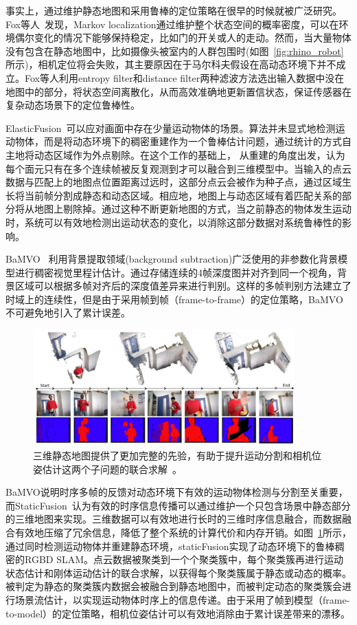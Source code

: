事实上，通过维护静态地图和采用鲁棒的定位策略在很早的时候就被广泛研究。Fox等人~\cite{fox1999}发现，Markov localization通过维护整个状态空间的概率密度，可以在环境偶尔变化的情况下能够保持稳定，比如门的开关或人的走动。然而，当大量物体没有包含在静态地图中，比如摄像头被室内的人群包围时(如图~\ref{fig:rhino_robot}所示)，相机定位将会失败，其主要原因在于马尔科夫假设在高动态环境下并不成立。Fox等人利用entropy filter和distance filter两种滤波方法选出输入数据中没在地图中的部分，将状态空间离散化，从而高效准确地更新置信状态，保证传感器在复杂动态场景下的定位鲁棒性。

ElasticFusion~\cite{elasticFusion}可以应对画面中存在少量运动物体的场景。算法并未显式地检测运动物体，而是将动态环境下的稠密重建作为一个鲁棒估计问题，通过统计的方式自主地将动态区域作为外点剔除。在这个工作的基础上，\cite{keller13_3dv} 从重建的角度出发，认为每个面元只有在多个连续帧被反复观测到才可以融合到三维模型中。当输入的点云数据与匹配上的地图点位置距离过远时，这部分点云会被作为种子点，通过区域生长将当前帧分割成静态和动态区域。相应地，地图上与动态区域有着匹配关系的部分将从地图上剔除掉。通过这种不断更新地图的方式，当之前静态的物体发生运动时，系统可以有效地检测出运动状态的变化，以消除这部分数据对系统鲁棒性的影响。

BaMVO~\cite{BaMVO} 利用背景提取领域(background subtraction)广泛使用的非参数化背景模型进行稠密视觉里程计估计。通过存储连续的4帧深度图并对齐到同一个视角，背景区域可以根据多帧对齐后的深度值差异来进行判别。这样的多帧判别方法建立了时域上的连续性，但是由于采用帧到帧（frame-to-frame）的定位策略，BaMVO不可避免地引入了累计误差。

\begin{figure}[!htbp]
	\centering
	\includegraphics[width=0.9\textwidth]{figs/2-1/staticFusion.jpeg}
	\caption{三维静态地图提供了更加完整的先验，有助于提升运动分割和相机位姿估计这两个子问题的联合求解~\cite{staticFusion}。}
	\label{fig:staticFusion}
\end{figure}

BaMVO说明时序多帧的反馈对动态环境下有效的运动物体检测与分割至关重要，而StaticFusion~\cite{staticFusion}认为有效的时序信息传播可以通过维护一个只包含场景中静态部分的三维地图来实现。三维数据可以有效地进行长时的三维时序信息融合，而数据融合有效地压缩了冗余信息，降低了整个系统的计算代价和内存开销。如图~\ref{fig:staticFusion}所示，通过同时检测运动物体并重建静态环境，staticFusion实现了动态环境下的鲁棒稠密的RGBD SLAM。点云数据被聚类到一个个聚类簇中，每个聚类簇再进行运动状态估计和刚体运动估计的联合求解，以获得每个聚类簇属于静态或动态的概率。被判定为静态的聚类簇内数据会被融合到静态地图中，而被判定动态的聚类簇会进行场景流估计，以实现运动物体时序上的信息传递。由于采用了帧到模型（frame-to-model）的定位策略，相机位姿估计可以有效地消除由于累计误差带来的漂移。

